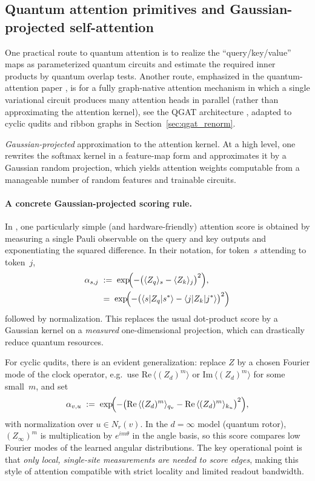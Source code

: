 \documentclass[11pt,oneside]{amsbook}
\numberwithin{equation}{section}
\theoremstyle{plain}
\theoremstyle{definition}
\theoremstyle{remark}
\begin{document}
\subsection{Quantum attention primitives and Gaussian-projected self-attention}
One practical route to quantum attention is to realize the ``query/key/value'' maps as parameterized
quantum circuits and estimate the required inner products by quantum overlap tests.
Another route, emphasized in the quantum-attention paper \cite{Li2022QuantumAttention}, is for a fully graph-native attention mechanism in which a single variational circuit produces many attention heads in parallel (rather than approximating the attention kernel), see the QGAT architecture \cite{Ning2025QGAT}, adapted to cyclic qudits and ribbon graphs in Section~\ref{sec:qgat_renorm}.

\emph{Gaussian-projected} approximation to the attention kernel.
At a high level, one rewrites the softmax kernel in a feature-map form and approximates it by a
Gaussian random projection, which yields attention weights computable from a manageable number of
random features and trainable circuits.

\paragraph{A concrete Gaussian-projected scoring rule.}
In \cite{Li2022QuantumAttention}, one particularly simple (and hardware-friendly) attention score is obtained by
measuring a single Pauli observable on the query and key outputs and exponentiating the squared difference.
In their notation, for token~$s$ attending to token~$j$,
\begin{align}
  \alpha_{s,j}\; &:=\;\exp\!\Bigl(-\bigl(\langle Z_q\rangle_s-\langle Z_k\rangle_j\bigr)^2\Bigr), \\ 
  				 &= \;\exp\!\Bigl(-\bigl(\langle s| Z_q| s^*\rangle-\langle j| Z_k| j^* \rangle \bigr)^2\Bigr)
\end{align}
followed by normalization. This replaces the usual dot-product score by a Gaussian kernel on a \emph{measured}
one-dimensional projection, which can drastically reduce quantum resources.

For cyclic qudits, there is an evident generalization: replace $Z$ by a chosen Fourier mode of the clock operator,
e.g.\ use $\mathrm{Re}\,\langle (Z_d)^m\rangle$ or $\mathrm{Im}\,\langle (Z_d)^m\rangle$ for some small~$m$,
and set
\[
  \alpha_{v,u}\;:=\;\exp\!\Bigl(-\bigl(\mathrm{Re}\,\langle (Z_d)^m\rangle_{q_v}-\mathrm{Re}\,\langle (Z_d)^m\rangle_{k_u}\bigr)^2\Bigr),
\]
with normalization over $u\in N_r(v)$. In the $d=\infty$ model (quantum rotor), $(Z_\infty)^m$ is multiplication by
$e^{im\theta}$ in the angle basis, so this score compares low Fourier modes of the learned angular distributions.
The key operational point is that \emph{only local, single-site measurements are needed to score edges}, making
this style of attention compatible with strict locality and limited readout bandwidth.
\end{document}
